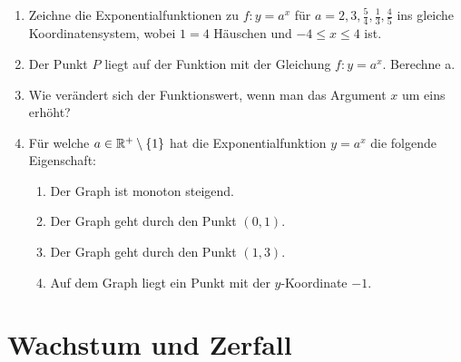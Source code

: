 \documentclass[11pt,oneside]{article}
\begin{document}
	\begin{aufgabe}
		\begin{enumerate}
			\item Zeichne die Exponentialfunktionen zu $f:y=a^x$ für $a=2,3,\frac{5}{4},\frac{1}{3},\frac{4}{5}$ ins gleiche Koordinatensystem, wobei $1=4$ Häuschen und $-4\leq x\leq 4$ ist.
			\item Der Punkt $P$ liegt auf der Funktion mit der Gleichung $f:y=a^x$. Berechne a.
			\item Wie verändert sich der Funktionswert, wenn man das Argument $x$ um eins erhöht?
			\item Für welche $a\in\mathbb{R}^+\setminus\{1\}$ hat die Exponentialfunktion $y=a^x$ die folgende Eigenschaft:
			\begin{enumerate}[label=\alph*)]
				\item Der Graph ist monoton steigend.
				\item Der Graph geht durch den Punkt $(0,1)$.
				\item Der Graph geht durch den Punkt $(1,3)$.
				\item Auf dem Graph liegt ein Punkt mit der $y$-Koordinate $-1$.
			\end{enumerate}
		\end{enumerate}
	\end{aufgabe}


\newpage
\section{Wachstum und Zerfall}
\end{document}
